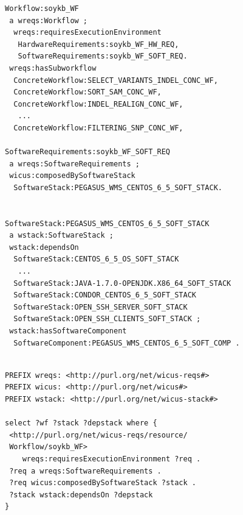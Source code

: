 \begin{lstlisting}[caption={WICUS workflow annotations example.}, label={lst:wicus-sample}]
Workflow:soykb_WF
 a wreqs:Workflow ;
  wreqs:requiresExecutionEnvironment
   HardwareRequirements:soykb_WF_HW_REQ,
   SoftwareRequirements:soykb_WF_SOFT_REQ.
 wreqs:hasSubworkflow
  ConcreteWorkflow:SELECT_VARIANTS_INDEL_CONC_WF, 
  ConcreteWorkflow:SORT_SAM_CONC_WF, 
  ConcreteWorkflow:INDEL_REALIGN_CONC_WF, 
   ...
  ConcreteWorkflow:FILTERING_SNP_CONC_WF,      
   
SoftwareRequirements:soykb_WF_SOFT_REQ
 a wreqs:SoftwareRequirements ;
 wicus:composedBySoftwareStack
  SoftwareStack:PEGASUS_WMS_CENTOS_6_5_SOFT_STACK.
  

SoftwareStack:PEGASUS_WMS_CENTOS_6_5_SOFT_STACK
 a wstack:SoftwareStack ;
 wstack:dependsOn
  SoftwareStack:CENTOS_6_5_OS_SOFT_STACK 
   ...
  SoftwareStack:JAVA-1.7.0-OPENJDK.X86_64_SOFT_STACK 
  SoftwareStack:CONDOR_CENTOS_6_5_SOFT_STACK 
  SoftwareStack:OPEN_SSH_SERVER_SOFT_STACK 
  SoftwareStack:OPEN_SSH_CLIENTS_SOFT_STACK ;
 wstack:hasSoftwareComponent
  SoftwareComponent:PEGASUS_WMS_CENTOS_6_5_SOFT_COMP .


\end{lstlisting}



\begin{lstlisting}[caption={WICUS SPARQL query example.}, label={lst:wicus-query}]
PREFIX wreqs: <http://purl.org/net/wicus-reqs#> 
PREFIX wicus: <http://purl.org/net/wicus#> 
PREFIX wstack: <http://purl.org/net/wicus-stack#> 

select ?wf ?stack ?depstack where {
 <http://purl.org/net/wicus-reqs/resource/
 Workflow/soykb_WF> 
    wreqs:requiresExecutionEnvironment ?req .
 ?req a wreqs:SoftwareRequirements .
 ?req wicus:composedBySoftwareStack ?stack .
 ?stack wstack:dependsOn ?depstack 
}
\end{lstlisting}



